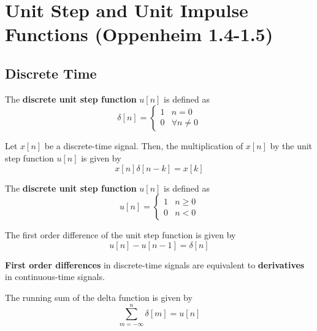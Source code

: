 \chapter{Unit Step and Unit Impulse Functions (Oppenheim 1.4-1.5)}

\section{Discrete Time}
\begin{definition}
    The \textbf{discrete unit step function} $u[n]$ is defined as
    $$ \delta[n] = \begin{cases}
            1 & n = 0            \\
            0 & \forall n \neq 0
        \end{cases} $$
\end{definition}


\begin{corollary}
    Let $x[n]$ be a discrete-time signal. Then, the multiplication of $x[n]$ by the unit step function $u[n]$ is given by
    $$ x[n]\delta[n - k] = x[k] $$
\end{corollary}

\begin{definition}
    The \textbf{discrete unit step function} $u[n]$ is defined as
    $$ u[n] = \begin{cases}
            1 & n \geq 0 \\
            0 & n < 0
        \end{cases} $$
\end{definition}
\begin{corollary}
    The first order difference of the unit step function is given by
    $$ u[n] - u[n - 1] = \delta[n] $$
\end{corollary}

\begin{remark}
    \textbf{First order differences} in discrete-time signals are equivalent to \textbf{derivatives} in continuous-time signals.
\end{remark}

\begin{corollary}
    The running sum of the delta function is given by
    $$ \sum_{m = -\infty}^{n} \delta[m] = u[n] $$
\end{corollary}

